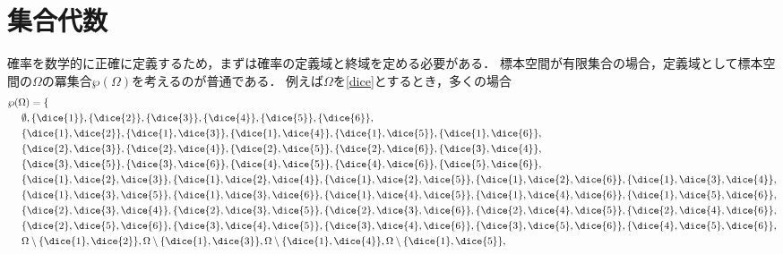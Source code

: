\documentclass[../main.tex]{subfiles}
\begin{document}
\section{集合代数}
確率を数学的に正確に定義するため，まずは確率の定義域と終域を定める必要がある．
標本空間が有限集合の場合，定義域として標本空間の\(\Omega\)の冪集合\(\wp(\Omega)\)を考えるのが普通である．
例えば\(\Omega\)を\eqref{dice}とするとき，多くの場合
\begin{align*}
    & \wp(\Omega) = \{ \\
    & \ \ \ \ \emptyset, \{\dice{1}\}, \{\dice{2}\}, \{\dice{3}\}, \{\dice{4}\}, \{\dice{5}\}, \{\dice{6}\}, \\
    & \ \ \ \ 
        \{\dice{1}, \dice{2}\},
        \{\dice{1}, \dice{3}\},
        \{\dice{1}, \dice{4}\},
        \{\dice{1}, \dice{5}\},
        \{\dice{1}, \dice{6}\}, \\
    & \ \ \ \ 
        \{\dice{2}, \dice{3}\},
        \{\dice{2}, \dice{4}\},
        \{\dice{2}, \dice{5}\},
        \{\dice{2}, \dice{6}\},
        \{\dice{3}, \dice{4}\}, \\
    & \ \ \ \ 
        \{\dice{3}, \dice{5}\},
        \{\dice{3}, \dice{6}\},
        \{\dice{4}, \dice{5}\},
        \{\dice{4}, \dice{6}\},
        \{\dice{5}, \dice{6}\}, \\
    & \ \ \ \ 
        \{\dice{1}, \dice{2}, \dice{3}\},
        \{\dice{1}, \dice{2}, \dice{4}\},
        \{\dice{1}, \dice{2}, \dice{5}\},
        \{\dice{1}, \dice{2}, \dice{6}\},
        \{\dice{1}, \dice{3}, \dice{4}\}, \\
    & \ \ \ \ 
        \{\dice{1}, \dice{3}, \dice{5}\},
        \{\dice{1}, \dice{3}, \dice{6}\},
        \{\dice{1}, \dice{4}, \dice{5}\},
        \{\dice{1}, \dice{4}, \dice{6}\},
        \{\dice{1}, \dice{5}, \dice{6}\}, \\
    & \ \ \ \ 
        \{\dice{2}, \dice{3}, \dice{4}\},
        \{\dice{2}, \dice{3}, \dice{5}\},
        \{\dice{2}, \dice{3}, \dice{6}\},
        \{\dice{2}, \dice{4}, \dice{5}\},
        \{\dice{2}, \dice{4}, \dice{6}\}, \\
    & \ \ \ \ 
        \{\dice{2}, \dice{5}, \dice{6}\},
        \{\dice{3}, \dice{4}, \dice{5}\},
        \{\dice{3}, \dice{4}, \dice{6}\},
        \{\dice{3}, \dice{5}, \dice{6}\},
        \{\dice{4}, \dice{5}, \dice{6}\}, \\
    & \ \ \ \ 
        \Omega \setminus \{\dice{1}, \dice{2}\},
        \Omega \setminus \{\dice{1}, \dice{3}\},
        \Omega \setminus \{\dice{1}, \dice{4}\},
        \Omega \setminus \{\dice{1}, \dice{5}\},

\end{align*}
\end{document}
